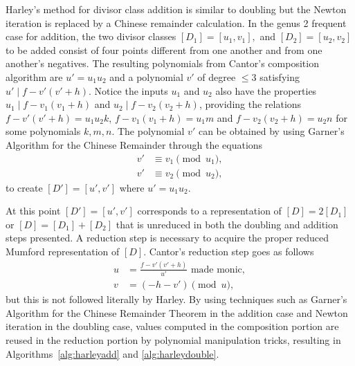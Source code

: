 Harley's method for divisor class addition is similar to doubling but the Newton
iteration is replaced by a Chinese remainder calculation. In the genus 2
frequent case for addition, the two divisor classes $[D_1] = [u_1, v_1],$ and
$[D_2] = [u_2,v_2]$ to be added consist of four points different from one
another and from one another's negatives. The resulting polynomials from Cantor's
composition algorithm are $u' = u_1u_2$ and a polynomial $v'$ of degree $\leq 3$
satisfying $u' \mid f - v'(v' + h)$. Notice the inputs $u_1$ and $u_2$ also have
the properties $u_1 \mid f - v_1(v_1 + h)$ and $u_2 \mid f - v_2(v_2 + h)$,
providing the relations $ f - v'(v' + h) = u_1u_2k$, $f - v_1(v_1 + h) = u_1m$
and $f - v_2(v_2 + h) = u_2n$ for some polynomials $k,m,n$. The polynomial $v'$
can be obtained by using Garner's Algorithm for the Chinese Remainder through
the equations
\begin{align*} v' &\equiv v_1 \pmod{u_1},\\
v' &\equiv v_2 \pmod{u_2}, \nonumber
\end{align*} to create $[D'] =[u',v']$ where $u' = u_1u_2$.

At this point $[D'] = [u',v']$ corresponds to a representation of $[D] = 2[D_1]$
or $[D] = [D_1] + [D_2]$ that is unreduced in both the doubling and addition
steps presented. A reduction step is necessary to acquire the proper reduced
Mumford representation of $[D]$. Cantor's reduction step goes as follows
\begin{align} u &= \frac{f- v'(v' + h)}{u'} \mbox{ made monic}, \label{eq:red1} \\
v &= (-h - v') \pmod{u} \label{eq:red2},
\end{align} but this is not followed literally by Harley. 
By using techniques such as Garner's Algorithm for the Chinese Remainder Theorem in
the addition case and Newton iteration in the doubling case, values computed in
the composition portion are reused in the reduction portion by polynomial
manipulation tricks, resulting in Algorithms~\ref{alg:harleyadd} and
\ref{alg:harleydouble}.

